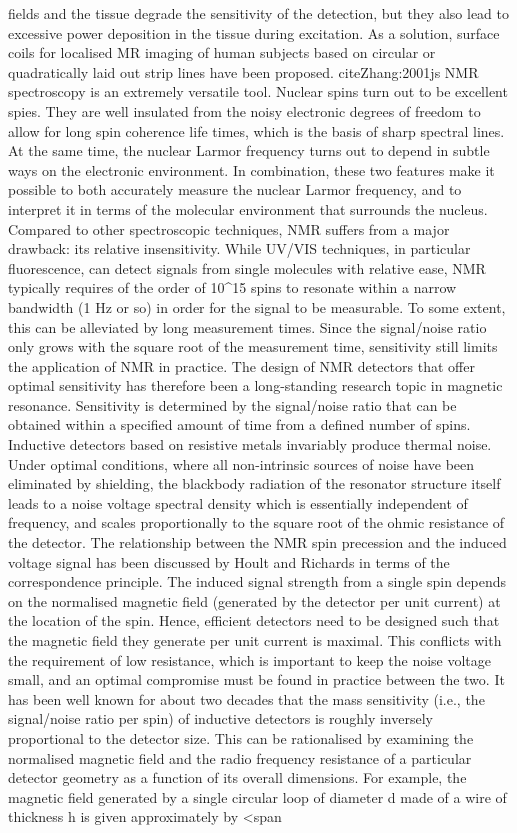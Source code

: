 fields and the tissue degrade the sensitivity of the detection, but they also lead to excessive power deposition in the tissue during excitation. As a solution, surface coils for localised MR imaging of human subjects based on circular or quadratically laid out strip lines have been proposed. cite{Zhang:2001js} NMR spectroscopy is an extremely versatile tool. Nuclear spins turn out to be excellent spies. They are well insulated from the noisy electronic degrees of freedom to allow for long spin coherence life times, which is the basis of sharp spectral lines. At the same time, the nuclear Larmor frequency turns out to depend in subtle ways on the electronic environment. In combination, these two features make it possible to both accurately measure the nuclear Larmor frequency, and to interpret it in terms of the molecular environment that surrounds the nucleus. Compared to other spectroscopic techniques, NMR suffers from a major drawback: its relative insensitivity. While UV/VIS techniques, in particular fluorescence, can detect signals from single molecules with relative ease, NMR typically requires of the order of 10^15 spins to resonate within a narrow bandwidth (1 Hz or so) in order for the signal to be measurable. To some extent, this can be alleviated by long measurement times. Since the signal/noise ratio only grows with the square root of the measurement time, sensitivity still limits the application of NMR in practice. The design of NMR detectors that offer optimal sensitivity has therefore been a long-standing research topic in magnetic resonance. Sensitivity is determined by the signal/noise ratio that can be obtained within a specified amount of time from a defined number of spins. Inductive detectors based on resistive metals invariably produce thermal noise. Under optimal conditions, where all non-intrinsic sources of noise have been eliminated by shielding, the blackbody radiation of the resonator structure itself leads to a noise voltage spectral density which is essentially independent of frequency, and scales proportionally to the square root of the ohmic resistance of the detector. The relationship between the NMR spin precession and the induced voltage signal has been discussed by Hoult and Richards in terms of the correspondence principle. The induced signal strength from a single spin depends on the normalised magnetic field (generated by the detector per unit current) at the location of the spin. Hence, efficient detectors need to be designed such that the magnetic field they generate per unit current is maximal. This conflicts with the requirement of low resistance, which is important to keep the noise voltage small, and an optimal compromise must be found in practice between the two. It has been well known for about two decades that the mass sensitivity (i.e., the signal/noise ratio per spin) of inductive detectors is roughly inversely proportional to the detector size. This can be rationalised by examining the normalised magnetic field and the radio frequency resistance of a particular detector geometry as a function of its overall dimensions. For example, the magnetic field generated by a single circular loop of diameter d made of a wire of thickness h is given approximately by <span 